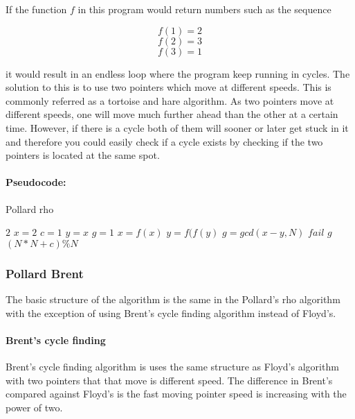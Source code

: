 If the function \(f\) in this program would return numbers such as the sequence

\[f(1) = 2\] 
\[f(2) = 3\] 
\[f(3) = 1\]

it would result in an endless loop where the program keep running in cycles. The solution to this is to use two pointers which move at different speeds. This is commonly referred as a tortoise and hare algorithm. 
As two pointers move at different speeds, one will move much further ahead than the other at a certain time. However, if there is a cycle both of them will sooner or later get stuck in it and therefore you could easily check if a cycle exists by checking if the two pointers is located at the same spot.

\paragraph{Pseudocode:}

\textcolor{white}{ }

\begin{algorithm}[H]
\caption{Pollard rho}
\begin{algorithmic}
	 	\State \Return $2$
	\EndIf
	\State $x = 2$
	\State $c = 1$
	\State $y = x$
	\State $g = 1$
		\State $x = f(x)$
		\State $y = f(f(y)$
		\State $g = gcd(x-y,N)$
	\EndWhile
		\State \Return $fail$
	\EndIf
	\State \Return $g$	
\EndFunction
{}
	\State \Return $(N*N + c) \% N$
\EndFunction
\end{algorithmic}
\end{algorithm}

\subsubsection{Pollard Brent}

The basic structure of the algorithm is the same in the Pollard's rho algorithm with the exception of using Brent's cycle finding algorithm instead of Floyd's.

\paragraph{Brent's cycle finding}

Brent’s cycle finding algorithm is uses the same structure as Floyd’s algorithm with two pointers that that move is different speed. The difference in Brent’s compared against Floyd’s is the fast moving pointer speed is increasing with the power of two.

